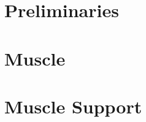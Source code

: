 

\setcounter{tocdepth}{1}
\setcounter{minitocdepth}{1} 

    \dominitoc%
    \adjustmtc[2]%
    \tableofcontents
    \label{toc-contents}

	




%
%
%


\part{Preliminaries}





\part{Muscle}







\part{Muscle Support}







